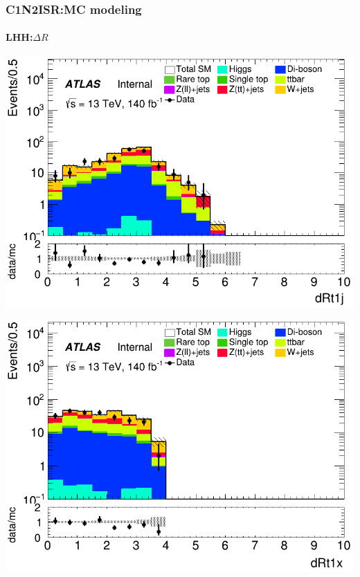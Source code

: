 \documentclass[usenames,dvipsnames]{beamer}
\begin{document}
\begin{frame}
\frametitle{C1N2ISR:MC modeling}
\framesubtitle{LHH:\quad $\Delta R$}
    \begin{minipage}{0.32\textwidth}
        \centering
        \includegraphics[width=\textwidth]{graphics/LHH_met/LHH_met_dRt1j.png}
    \end{minipage}
    \hfill
    \begin{minipage}{0.32\textwidth}
        \centering
        \includegraphics[width=\textwidth]{graphics/LHH_met/LHH_met_dRt1x.png}
    \end{minipage}
    \hfill
    \begin{minipage}{0.32\textwidth}
        \centering

\end{minipage}
\end{frame}
\end{document}
